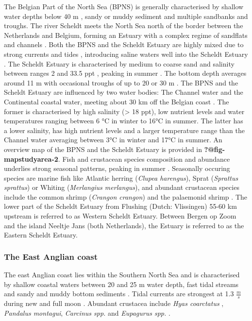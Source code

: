 \documentclass[
  authoryear,
  review,
  3p]{elsarticle}
\begin{document}
The Belgian Part of the North Sea (BPNS) is generally characterised by
shallow water depths below 40 m \citep{thierry_2019}, sandy or muddy
sediment \citep{wolff_1973, vasquez_2021} and multiple sandbanks and
troughs. The river Scheldt meets the North Sea north of the border
between the Netherlands and Belgium, forming an Estuary with a complex
regime of sandflats and channels \citep{claessens_1988}. Both the BPNS
and the Scheldt Estuary are highly mixed due to strong currents and
tides \citep{otto_1990}, introducing saline waters well into the Scheldt
Estuary \citep{ouboter_1998}. The Scheldt Estuary is characterised by
medium to coarse sand and salinity between ranges 2 and 33.5 ppt
\citep{baeyens_1998}, peaking in summer \citep{maes_1998}. The bottom
depth averages around 11 m with occasional troughs of up to 20 or 30 m
\citep{thierry_2019}. The BPNS and the Scheldt Estuary are influenced by
two water bodies: The Channel water and the Continental coastal water,
meeting about 30 km off the Belgian coast \citep{wolff_1973}. The former
is characterised by high salinity (\textgreater{} 18 ppt), low nutrient
levels and water temperatures ranging between 6 °C in winter to 16°C in
summer. The latter has a lower salinity, has high nutrient levels and a
larger temperature range than the Channel water averaging between 3°C in
winter and 17°C in summer. An overview map of the BPNS and the Scheldt
Estuary is provided in \textbf{?@fig-mapstudyarea-2}. Fish and
crustacean species composition and abundance underlies strong seasonal
patterns, peaking in summer \citep{maes_1998, maes_2005}. Seasonally
occuring species are marine fish like Atlantic herring (\emph{Clupea
harengus}), Sprat (\emph{Sprattus sprattus}) or Whiting
(\emph{Merlangius merlangus}), and abundant crustacean species include
the common shrimp (\emph{Crangon crangon}) and the palaemonid shrimp
\citep[\emph{Palaemon varians},][]{maes_1998}. The lower part of the
Scheldt Estuary from Flushing (Dutch: Vlissingen) 55-60 km upstream is
referred to as Western Scheldt
Estuary\citep{baeyens_1998, ouboter_1998}. Between Bergen op Zoom and
the island Neeltje Jans (both Netherlands), the Estuary is referred to
as the Eastern Scheldt Estuary.

\hypertarget{the-east-anglian-coast}{%
\subsubsection{The East Anglian coast}\label{the-east-anglian-coast}}

The east Anglian coast lies within the Southern North Sea and is
characterised by shallow coastal waters between 20 and 25 m water depth,
fast tidal streams and sandy and muddy bottom sediments
\citep{harrison_1990}. Tidal currents are strongest at 1.3
\(\frac{m}{s}\) during new and full moon \citep{arnold_1994}. Abundant
crustacea include \emph{Hyas coarctatus} \citep{dyer_1985},
\emph{Pandalus montagui}, \emph{Carcinus spp.} and \emph{Eupagurus spp.}
\citep{sergeant_1951}.
\end{document}
